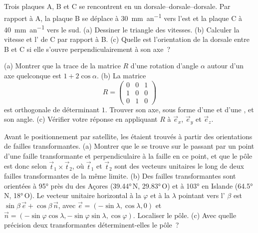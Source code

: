 \begin{exercise}[$\star\star$]\label{exo:b1:plate-kinematics:9}
Trois plaques A, B et C se rencontrent en un  dorsale--dorsale--dorsale.
Par rapport à A, la plaque B se déplace à \qty{30}{mm.an^{-1}} vers l'est et la plaque C à
\qty{40}{mm.an^{-1}} vers le sud. (a) Dessiner le triangle des vitesses.
(b) Calculer la vitesse et l' de C par rapport à B. (c) Quelle est l'orientation de
la dorsale entre B et C si elle s'ouvre perpendiculairement à son axe~?
\end{exercise}

\begin{exercise}[$\star\star\star$]\label{exo:b1:plate-kinematics:10}
(a) Montrer que la trace de la matrice $R$ d'une rotation d'angle $\alpha$ autour d'un axe quelconque
est $1 + 2\cos\alpha$. (b) La matrice
\[
  R = \begin{pmatrix} 0 & 0 & 1\\ 1 & 0 & 0\\ 0 & 1 & 0\end{pmatrix}
\]
est orthogonale de déterminant $1$. Trouver son axe, sous forme d'une  et d'une ,
et son angle. (c) Vérifier votre réponse en appliquant $R$ à $\vec e_x$, $\vec e_y$
et $\vec e_z$.
\end{exercise}

\begin{exercise}[$\star\star\star$]\label{exo:b1:plate-kinematics:11}
Avant le positionnement par satellite, les  étaient trouvés à partir des orientations de
failles transformantes. (a) Montrer que le  se trouve sur le  passant par
un point d'une faille transformante et perpendiculaire à la faille en ce point, et que
le pôle est donc selon $\vec t_1\times\vec t_2$, où $\vec t_1$ et
$\vec t_2$ sont des vecteurs unitaires le long de deux failles transformantes de la même limite.
(b) Des failles transformantes sont orientées à \ang{95} près du  des Açores
(\ang{39.44}\,N, \ang{29.83}\,O) et à \ang{103} en Islande (\ang{64.5}\,N,
\ang{18}\,O). Le vecteur unitaire horizontal à la  $\varphi$ et à la 
$\lambda$ pointant vers l' $\beta$ est $\sin\beta\,\vec e +
\cos\beta\,\vec n$, avec $\vec e = (-\sin\lambda, \cos\lambda, 0)$ et $\vec n =
(-\sin\varphi\cos\lambda, -\sin\varphi\sin\lambda, \cos\varphi)$. Localiser le
pôle. (c) Avec quelle précision deux transformantes déterminent-elles le pôle~?
\end{exercise}

